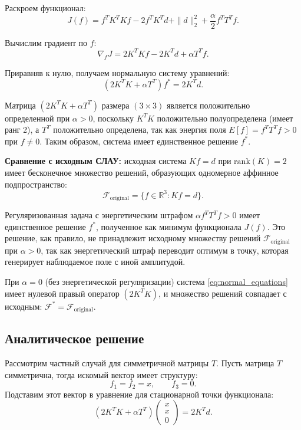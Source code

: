 \documentclass[a4paper,14pt,oneside,openany]{extarticle}
\begin{document}
Раскроем функционал:
\begin{equation}
    J(f) = f^TK^TKf - 2f^TK^Td + \|d\|_2^2 + \frac{\alpha}{2}f^T T^T f.
\end{equation}

Вычислим градиент по $f$:
\begin{equation}
    \nabla_f J = 2K^TKf - 2K^Td + \alpha T^T f.
\end{equation}

Приравняв к нулю, получаем нормальную систему уравнений:
\begin{equation}\label{eq:normal_equations}
    (2K^TK + \alpha T^T)f^* = 2K^Td.
\end{equation}

Матрица $(2K^TK + \alpha T^T)$ размера $(3 \times 3)$ является положительно определенной 
при $\alpha > 0$, поскольку $K^TK$ положительно полуопределена (имеет ранг 2), а $T^T$ 
положительно определена, так как энергия поля $E[f] = f^T T^T f > 0$ при $f \neq 0$.
Таким образом, система имеет единственное решение $f^*$.

\textbf{Сравнение с исходным СЛАУ:} исходная система $Kf = d$ при $\mathrm{rank}(K) = 2$ 
имеет бесконечное множество решений, образующих одномерное аффинное подпространство:
\begin{equation}\label{eq:original_solution_set}
    \mathcal{F}_{\mathrm{original}} = \{f \in \mathbb{R}^3 : Kf = d\}.
\end{equation}

Регуляризованная задача с энергетическим штрафом $\alpha f^T T^T f > 0$ имеет единственное 
решение $f^*$, полученное как минимум функционала $J(f)$. Это решение, как правило, не 
принадлежит исходному множеству решений $\mathcal{F}_{\mathrm{original}}$ при $\alpha > 0$, 
так как энергетический штраф переводит оптимум в точку, которая генерирует наблюдаемое поле
с иной амплитудой.

При $\alpha = 0$ (без энергетической регуляризации) система \eqref{eq:normal_equations} 
имеет нулевой правый оператор $(2K^TK)$, и множество решений совпадает с исходным: 
$\mathcal{F}^* = \mathcal{F}_{\mathrm{original}}$.

\subsection{Аналитическое решение}

Рассмотрим частный случай для симметричной матрицы \(T\).
Пусть матрица \(T\) симметрична, тогда искомый вектор имеет структуру:
\[
f_1 = f_2 = x, \qquad f_3 = 0.
\]
Подставим этот вектор в уравнение для стационарной точки функционала:
\[
(2K^T K + \alpha T^T)\begin{pmatrix} x \\ x \\ 0 \end{pmatrix} = 2K^T d.
\]
\end{document}
